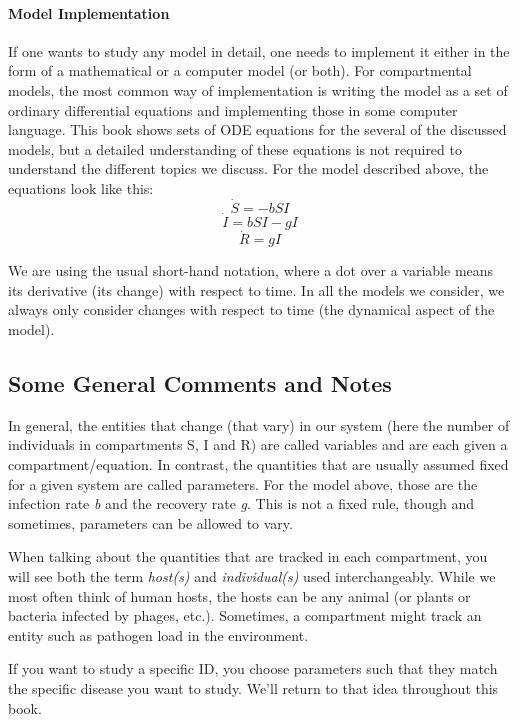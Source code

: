 \documentclass[]{article}
\let\oldparagraph\paragraph
\renewcommand{\paragraph}[1]{\oldparagraph{#1}\mbox{}}
\theoremstyle{definition}
\theoremstyle{definition}
\theoremstyle{definition}
\theoremstyle{remark}
\begin{document}
\paragraph{Model Implementation}\label{myadvancedbox}

If one wants to study any model in detail, one needs to implement it
either in the form of a mathematical or a computer model (or both). For
compartmental models, the most common way of implementation is writing
the model as a set of ordinary differential equations and implementing
those in some computer language. This book shows sets of ODE equations
for the several of the discussed models, but a detailed understanding of
these equations is not required to understand the different topics we
discuss. For the model described above, the equations look like this:
\[\dot S = -bSI\] \[\dot I = bSI - gI\] \[\dot R = gI\]

We are using the usual short-hand notation, where a dot over a variable
means its derivative (its change) with respect to time. In all the
models we consider, we always only consider changes with respect to time
(the dynamical aspect of the model).

\subsection{Some General Comments and
Notes}\label{some-general-comments-and-notes}

In general, the entities that change (that vary) in our system (here the
number of individuals in compartments S, I and R) are called variables
and are each given a compartment/equation. In contrast, the quantities
that are usually assumed fixed for a given system are called parameters.
For the model above, those are the infection rate \emph{b} and the
recovery rate \emph{g}. This is not a fixed rule, though and sometimes,
parameters can be allowed to vary.

When talking about the quantities that are tracked in each compartment,
you will see both the term \emph{host(s)} and \emph{individual(s)} used
interchangeably. While we most often think of human hosts, the hosts can
be any animal (or plants or bacteria infected by phages, etc.).
Sometimes, a compartment might track an entity such as pathogen load in
the environment.

If you want to study a specific ID, you choose parameters such that they
match the specific disease you want to study. We'll return to that idea
throughout this book.
\end{document}
